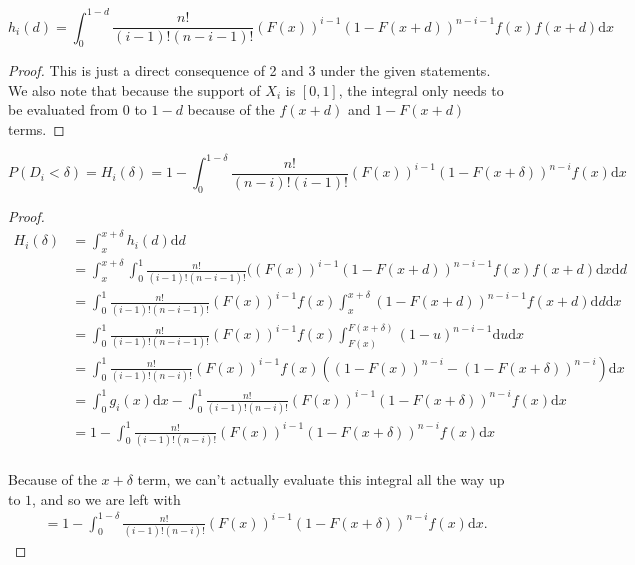 \documentclass[12pt]{article}
\begin{document}
\begin{lemma}
\begin{equation}
\label{eq:pdf}
h_i(d) = \int_0^{1-d} \frac{n!}{(i-1)! (n-i-1)!} (F(x))^{i-1} (1 - F(x+d))^{n-i-1} f(x) f(x+d) \mathrm{d}x 
\end{equation}
\end{lemma}

\begin{proof}
This is just a direct consequence of 2 and 3 under the given statements. 
We also note that because the support of $X_i$ is $[0, 1]$, 
the integral only needs to be evaluated from $0$ to $1 - d$ 
because of the $f(x+d)$ and $1 - F(x+d)$ terms.
\end{proof}

\begin{lemma}

\begin{equation}
\label{eq:cdf}
P(D_i < \delta) = H_i(\delta) = 1 - \int_0^{1-\delta} \frac{n!}{(n-i)! (i-1)!} (F(x))^{i-1} (1 - F(x + \delta))^{n-i} f(x) \mathrm{d}x
\end{equation}
\end{lemma}

\begin{proof}
$$
\begin{aligned}
H_i(\delta) & = \int_x^{x+\delta} h_i(d) \mathrm{d}d \\
& = \int_x^{x+\delta} \int_0^{1} \frac{n!}{(i-1)! (n-i-1)!} ((F(x))^{i-1} (1 - F(x+d))^{n-i-1} f(x) f(x+d) \mathrm{d}x \mathrm{d}d \\
& = \int_0^{1} \frac{n!}{(i-1)! (n-i-1)!} (F(x))^{i-1} f(x) \int_x^{x+\delta} (1 - F(x+d))^{n-i-1} f(x+d) \mathrm{d}d \mathrm{d}x \\
& = \int_0^{1} \frac{n!}{(i-1)! (n-i-1)!} (F(x))^{i-1} f(x) \int_{F(x)}^{F(x+\delta)} (1 - u)^{n-i-1} \mathrm{d}u \mathrm{d}x \\
& = \int_0^{1} \frac{n!}{(i-1)! (n-i)!} (F(x))^{i-1} f(x) ((1 - F(x))^{n-i} - (1 - F(x + \delta))^{n-i}) \mathrm{d}x \\ 
& = \int_0^1 g_i(x) \mathrm{d}x - \int_0^1 \frac{n!}{(i-1)! (n-i)!} (F(x))^{i-1} (1 - F(x + \delta))^{n-i} f(x) \mathrm{d}x \\
& = 1 - \int_0^1 \frac{n!}{(i-1)! (n-i)!} (F(x))^{i-1} (1 - F(x + \delta))^{n-i} f(x) \mathrm{d}x \\
\end{aligned}
$$

Because of the $x + \delta$ term, we can't actually evaluate this integral all the way up to $1$, and so we are left with 
$$
\begin{aligned}
& = 1 - \int_0^{1 - \delta} \frac{n!}{(i-1)! (n-i)!} (F(x))^{i-1} (1 - F(x + \delta))^{n-i} f(x) \mathrm{d}x.
\end{aligned}
$$
\end{proof}
\end{document}
